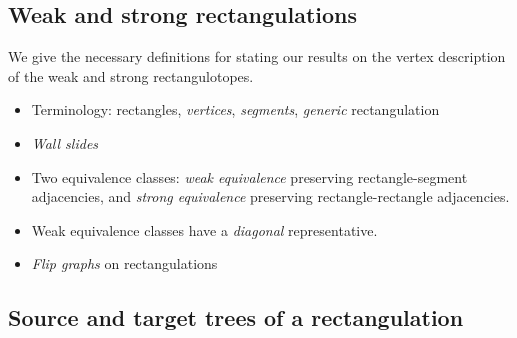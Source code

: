 \documentclass{amsart}
\theoremstyle{definition}
\newcommand{\darkblue}{\color{darkblue}} %
\newcommand{\defn}[1]{\textsl{\darkblue #1}} %
\begin{document}
\subsection{Weak and strong rectangulations}

We give the necessary definitions for stating our results on the vertex description of the weak and strong rectangulotopes.

\begin{itemize}
\item Terminology: rectangles, \defn{vertices}, \defn{segments}, \defn{generic} rectangulation
\item \defn{Wall slides}
\item Two equivalence classes: \defn{weak equivalence} preserving rectangle-segment adjacencies, and \defn{strong equivalence} preserving rectangle-rectangle adjacencies.
\item Weak equivalence classes have a \defn{diagonal} representative.
\item \defn{Flip graphs} on rectangulations
\end{itemize}


\subsection{Source and target trees of a rectangulation}
\label{subsec:sourceTargetTrees}

\end{document}
